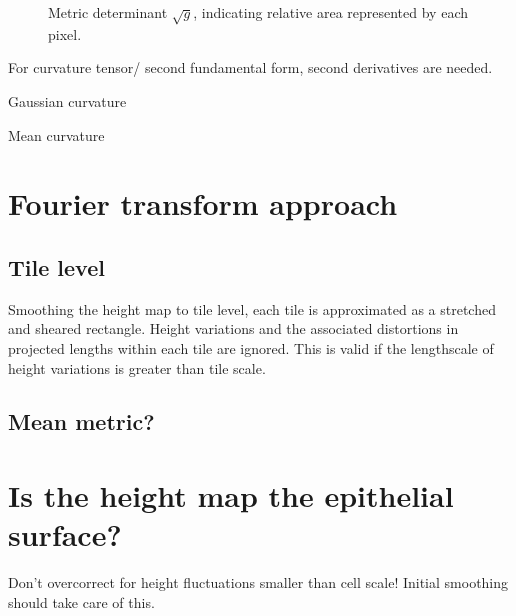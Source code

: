 \documentclass[10pt,a4paper]{article}
\begin{document}
\begin{figure}
\caption{Metric determinant $\sqrt{g}$, indicating relative area represented by each pixel.}
\end{figure}

For curvature tensor/ second fundamental form, second derivatives are needed.  

Gaussian curvature

Mean curvature

\section{Fourier transform approach}
\subsection{Tile level}
Smoothing the height map to tile level, each tile is approximated as a stretched and sheared rectangle.  Height variations and the associated distortions in projected lengths within each tile are ignored.  This is valid if the lengthscale of height variations is greater than tile scale.  
\subsection{Mean metric?}
\section{Is the height map the epithelial surface?}
Don't overcorrect for height fluctuations smaller than cell scale!  Initial smoothing should take care of this.
\end{document}
